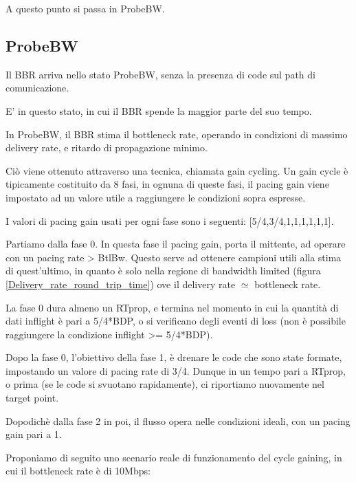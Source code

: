 A questo punto si passa in ProbeBW.

\subsection{ProbeBW} \label{ProbeBW}

Il BBR arriva nello stato ProbeBW, senza la presenza di code sul path di comunicazione. \bigskip

E' in questo stato, in cui il BBR spende la maggior parte del suo tempo. \bigskip

In ProbeBW, il BBR stima il bottleneck rate, operando in condizioni di massimo delivery rate, e ritardo di propagazione minimo. \bigskip

Ciò viene ottenuto attraverso una tecnica, chiamata gain cycling. Un gain cycle è tipicamente costituito da 8 fasi, in ognuna di queste fasi, il pacing gain viene impostato ad un valore utile a raggiungere le condizioni sopra espresse. \bigskip

I valori di pacing gain usati per ogni fase sono i seguenti: [5/4,3/4,1,1,1,1,1,1]. \bigskip

Partiamo dalla fase 0. In questa fase il pacing gain, porta il mittente, ad operare con un pacing rate > BtlBw. Questo serve ad ottenere campioni utili alla stima di quest'ultimo, in quanto è solo nella regione di bandwidth limited (figura \ref{Delivery_rate_round_trip_time}) ove il delivery rate $ \simeq $ bottleneck rate. \bigskip

La fase 0 dura almeno un RTprop, e termina nel momento in cui la quantità di dati inflight è pari a 5/4*BDP, o si verificano degli eventi di loss (non è possibile raggiungere la condizione inflight >= 5/4*BDP). \bigskip

Dopo la fase 0, l'obiettivo della fase 1, è drenare le code che sono state formate, impostando un valore di pacing rate di 3/4. Dunque in un tempo pari a RTprop, o prima (se le code si svuotano rapidamente), ci riportiamo nuovamente nel target point. \bigskip

Dopodichè dalla fase 2 in poi, il flusso opera nelle condizioni ideali, con un pacing gain pari a 1. \bigskip 

Proponiamo di seguito uno scenario reale di funzionamento del cycle gaining, in cui il bottleneck rate è di 10Mbps:

